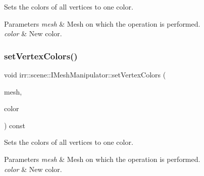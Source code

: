 Sets the colors of all vertices to one color. 


\begin{DoxyParams}{Parameters}
{\em mesh} & Mesh on which the operation is performed. \\
\hline
{\em color} & New color. \\
\hline
\end{DoxyParams}
\mbox{\label{classirr_1_1scene_1_1IMeshManipulator_a72bc31cb9468480698277f0f164e71ee}} 
\subsubsection{\texorpdfstring{set\+Vertex\+Colors()}{setVertexColors()}\hspace{0.1cm}{\footnotesize\ttfamily [2/4]}}
{\footnotesize\ttfamily void irr\+::scene\+::\+I\+Mesh\+Manipulator\+::set\+Vertex\+Colors (\begin{DoxyParamCaption}\item[{\hyperlink{classirr_1_1scene_1_1IMesh}{I\+Mesh} $\ast$}]{mesh,  }\item[{\hyperlink{classirr_1_1video_1_1SColor}{video\+::\+S\+Color}}]{color }\end{DoxyParamCaption}) const\hspace{0.3cm}{\ttfamily [inline]}}



Sets the colors of all vertices to one color. 


\begin{DoxyParams}{Parameters}
{\em mesh} & Mesh on which the operation is performed. \\
\hline
{\em color} & New color. \\
\hline
\end{DoxyParams}
\mbox{\label{classirr_1_1scene_1_1IMeshManipulator_ab13881bea577e0f0ffc03b102f29db6a}} 
